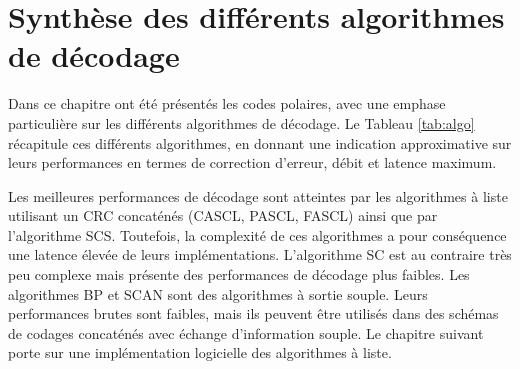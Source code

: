 \section{Synthèse des différents algorithmes de décodage}
 Dans ce chapitre ont été présentés les codes polaires, avec une emphase particulière sur les différents algorithmes de décodage. Le Tableau \ref{tab:algo} récapitule ces différents algorithmes, en donnant une indication approximative sur leurs performances en termes de correction d'erreur, débit et latence maximum.
  \begin{table}[htp]
    \centering
    \caption{Tendances des différents algorithmes concernant leurs pouvoirs de correction, débits et latences.}
    \label{tab:algo}
    {\small{}}
  \end{table}



Les meilleures performances de décodage sont atteintes par les algorithmes à liste utilisant un CRC concaténés (CASCL, PASCL, FASCL) ainsi que par l'algorithme SCS. Toutefois, la complexité de ces algorithmes a pour conséquence une latence élevée de leurs implémentations. L'algorithme SC est au contraire très peu complexe mais présente des performances de décodage plus faibles. Les algorithmes BP et SCAN sont des algorithmes à sortie souple. Leurs performances brutes sont faibles, mais ils peuvent être utilisés dans des schémas de codages concaténés avec échange d'information souple. Le chapitre suivant porte sur une implémentation logicielle des algorithmes à liste.